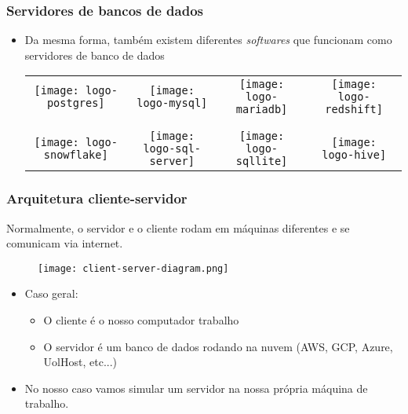 \documentclass[t, 10pt, aspectratio=169, table, x11names]{beamer}
\begin{document}
	\begin{frame}
		\frametitle{Servidores de bancos de dados}
		\begin{itemize}
			\item[] Da mesma forma, também existem diferentes \textit{softwares} que funcionam como servidores de banco de dados
			\bigskip\bigskip
			\begin{table}
				\begin{center}
					\begin{tabular}{cccc}
						\texttt{[image: logo-postgres]} &
						\texttt{[image: logo-mysql]} &
						\texttt{[image: logo-mariadb]} &
						\texttt{[image: logo-redshift]}
						\\ \\ \\
						\texttt{[image: logo-snowflake]} &
						\texttt{[image: logo-sql-server]} &
						\texttt{[image: logo-sqllite]} &
						\texttt{[image: logo-hive]}
					\end{tabular}
				\end{center}
			\end{table}
		\end{itemize}
	\end{frame}

	\begin{frame}
		\frametitle{Arquitetura cliente-servidor}
		Normalmente, o servidor e o cliente rodam em máquinas diferentes e se comunicam via internet. 
		\begin{figure}[h]
			\texttt{[image: client-server-diagram.png]}
		\end{figure}
		\begin{itemize}
			\item[] Caso geral:
			\begin{itemize}
				\item O cliente é o nosso computador trabalho
				\item O servidor é um banco de dados rodando na nuvem (AWS, GCP, Azure, UolHost, etc...)
			\end{itemize}
			\vspace{2mm}
			\item[] No nosso caso vamos simular um servidor na nossa própria máquina de trabalho. 
		\end{itemize}
	\end{frame}
\end{document}
